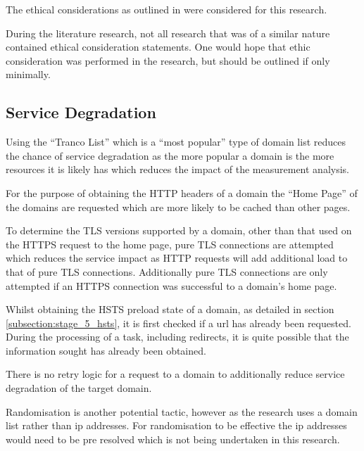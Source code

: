 \documentclass{mscreport}
\begin{document}
\vspace{0.3cm} \noindent
The ethical considerations as outlined in \cite{Amann2017-co,Partridge2016-ph,Durumeric2015-zq,Kumar2017-qw} were considered for this research.

\vspace{0.3cm} \noindent
During the literature research, not all research that was of a similar nature contained ethical consideration statements. One would hope that ethic consideration was performed in the research, but should be outlined if only minimally.

\subsection{Service Degradation}

Using the ``Tranco List'' which is a ``most popular'' type of domain list reduces the chance of service degradation as the more popular a domain is the more resources it is likely has which reduces the impact of the measurement analysis.

\vspace{0.3cm} \noindent
For the purpose of obtaining the HTTP headers of a domain the ``Home Page'' of the domains are requested which are more likely to be cached than other pages.

\vspace{0.3cm} \noindent
To determine the TLS versions supported by a domain, other than that used on the HTTPS request to the home page, pure TLS connections are attempted which reduces the service impact as HTTP requests will add additional load to that of pure TLS connections. Additionally pure TLS connections are only attempted if an HTTPS connection was successful to a domain's home page.

\vspace{0.3cm} \noindent
Whilst obtaining the HSTS preload state of a domain, as detailed in section \ref{subsection:stage_5_hsts}, it is first checked if a url has already been requested. During the processing of a task, including redirects, it is quite possible that the information sought has already been obtained.

\vspace{0.3cm} \noindent
There is no retry logic for a request to a domain to additionally reduce service degradation of the target domain.

\vspace{0.3cm} \noindent
Randomisation is another potential tactic, however as the research uses a domain list rather than ip addresses. For randomisation to be effective the ip addresses would need to be pre resolved which is not being undertaken in this research.
\end{document}
